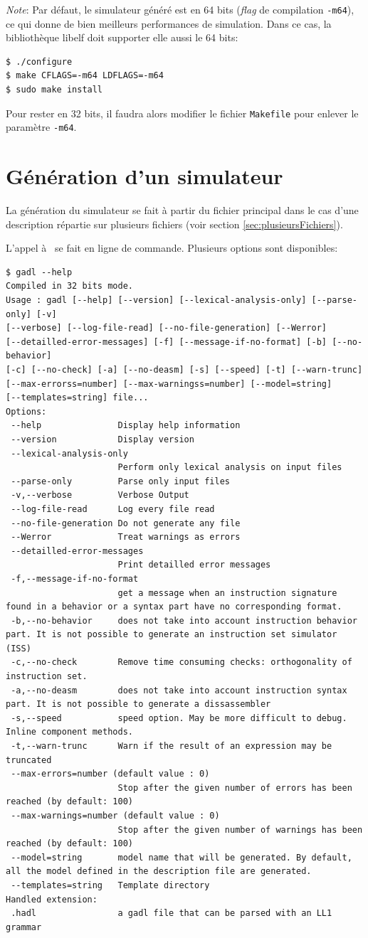 \emph{Note}: Par défaut, le simulateur généré est en 64 bits (\emph{flag} de compilation \texttt{-m64}), ce qui donne de bien meilleurs performances de simulation. Dans ce cas, la bibliothèque libelf doit supporter elle aussi le 64 bits:
\begin{verbatim}
$ ./configure
$ make CFLAGS=-m64 LDFLAGS=-m64
$ sudo make install
\end{verbatim}
Pour rester en 32 bits, il faudra alors modifier le fichier \texttt{Makefile} pour enlever le paramètre \texttt{-m64}.

\section{Génération d'un simulateur}
La génération du simulateur se fait à partir du fichier principal dans le cas d'une description répartie sur plusieurs fichiers (voir section \ref{sec:plusieursFichiers}).

L'appel à \gadl\ se fait en ligne de commande. Plusieurs options sont disponibles:
\begin{verbatim}
$ gadl --help
Compiled in 32 bits mode.
Usage : gadl [--help] [--version] [--lexical-analysis-only] [--parse-only] [-v] 
[--verbose] [--log-file-read] [--no-file-generation] [--Werror] 
[--detailled-error-messages] [-f] [--message-if-no-format] [-b] [--no-behavior] 
[-c] [--no-check] [-a] [--no-deasm] [-s] [--speed] [-t] [--warn-trunc] 
[--max-errorss=number] [--max-warningss=number] [--model=string] 
[--templates=string] file...
Options:
 --help               Display help information
 --version            Display version
 --lexical-analysis-only
                      Perform only lexical analysis on input files
 --parse-only         Parse only input files
 -v,--verbose         Verbose Output
 --log-file-read      Log every file read
 --no-file-generation Do not generate any file
 --Werror             Treat warnings as errors
 --detailled-error-messages
                      Print detailled error messages
 -f,--message-if-no-format
                      get a message when an instruction signature found in a behavior or a syntax part have no corresponding format.
 -b,--no-behavior     does not take into account instruction behavior part. It is not possible to generate an instruction set simulator (ISS)
 -c,--no-check        Remove time consuming checks: orthogonality of instruction set.
 -a,--no-deasm        does not take into account instruction syntax part. It is not possible to generate a dissassembler
 -s,--speed           speed option. May be more difficult to debug. Inline component methods.
 -t,--warn-trunc      Warn if the result of an expression may be truncated
 --max-errors=number (default value : 0)
                      Stop after the given number of errors has been reached (by default: 100)
 --max-warnings=number (default value : 0)
                      Stop after the given number of warnings has been reached (by default: 100)
 --model=string       model name that will be generated. By default, all the model defined in the description file are generated.
 --templates=string   Template directory
Handled extension:
 .hadl                a gadl file that can be parsed with an LL1 grammar
\end{verbatim}

